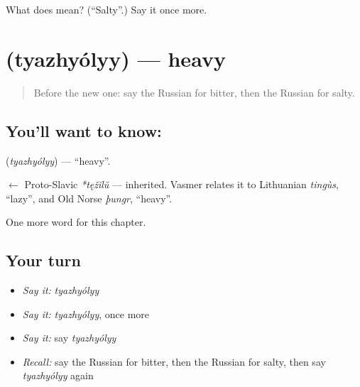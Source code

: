 \begin{tcolorbox}[breakable,colback=teal!4,colframe=teal!35!black,title={Before you move on}]
What does  mean? (\textquotedblleft{}Salty\textquotedblright{}.) Say it once more.
\end{tcolorbox}
\section[\texorpdfstring{\ru{тяжёлый} (tyazhyólyy)}{тяжёлый (tyazhyólyy)}]{ (tyazhyólyy) — heavy}

\label{lesson:RU-C130-heavy}



\begin{quote}
Before the new one: say the Russian for bitter, then the Russian for salty.
\end{quote}

\subsection*{You'll want to know: }
\textbf{} (\emph{tyazhyólyy}) — \textquotedblleft{}heavy\textquotedblright{}.

\begin{cousinweb}
\textbf{} $\leftarrow$ Proto-Slavic \emph{*tęžĭlŭ} — inherited. Vasmer relates it to Lithuanian \emph{tingùs}, \textquotedblleft{}lazy\textquotedblright{}, and Old Norse \emph{þungr}, \textquotedblleft{}heavy\textquotedblright{}.
\end{cousinweb}

\begin{grammarlens}[title={What you've built}]
One more word for this chapter.
\end{grammarlens}

\subsection*{Your turn}
\begin{itemize}
\raggedright
  \item \emph{Say it:} \emph{tyazhyólyy}
  \item \emph{Say it:} \emph{tyazhyólyy}, once more
  \item \emph{Say it:} say \emph{tyazhyólyy}
  \item \emph{Recall:} say the Russian for bitter, then the Russian for salty, then say \emph{tyazhyólyy} again
\end{itemize}

